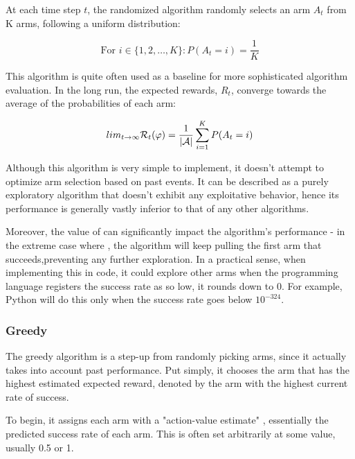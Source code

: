 
At each time step $t$, the randomized algorithm randomly selects an arm $A_t$ from K arms, following a uniform distribution:

$$\text{For } i \in \{1, 2, \ldots, K\}: P(A_t = i) = \frac{1}{K}$$

This algorithm is quite often used as a baseline for more sophisticated algorithm evaluation. In the long run, the expected rewards, $R_t$, converge towards the average of the probabilities of each arm:

$$lim_{{t \to \infty}} \mathcal{R}_{t}(\varphi) = \frac{1}{|\mathcal{A}|} \sum_{{i=1}}^{{K}} P(A_t = i)$$

Although this algorithm is very simple to implement, it doesn't attempt to optimize arm selection based on past events. It can be described as a purely exploratory algorithm that doesn't exhibit any exploitative behavior, hence its performance is generally vastly inferior to that of any other algorithms.

Moreover, the value of \actionValueEstimate \space can significantly impact the algorithm's performance - in the extreme case where , the algorithm will keep pulling the first arm that succeeds,preventing any further exploration.
In a practical sense, when implementing this in code, it could explore other arms when the programming language registers the success rate as so low, it rounds down to 0.
For example, Python will do this only when the success rate goes below $10^{-324}$\cite{python_min_float}.

\subsubsection{Greedy}
\label{sec:Greedy}
The greedy algorithm is a step-up from randomly picking arms, since it actually takes into account past performance. Put simply, it chooses the arm that has the highest estimated expected reward, denoted by the arm with the highest current rate of success.

To begin, it assigns each arm with a "action-value estimate" \actionValueEstimate, essentially the predicted success rate of each arm. This is often set arbitrarily at some value, usually 0.5 or 1.


